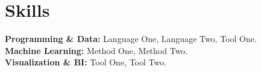 \documentclass[a4paper,10pt]{article}
\begin{document}
\section{Skills}
\noindent \textbf{Programming \& Data:} Language One, Language Two, Tool One. \\
\textbf{Machine Learning:} Method One, Method Two. \\
\textbf{Visualization \& BI:} Tool One, Tool Two.
\end{document}
